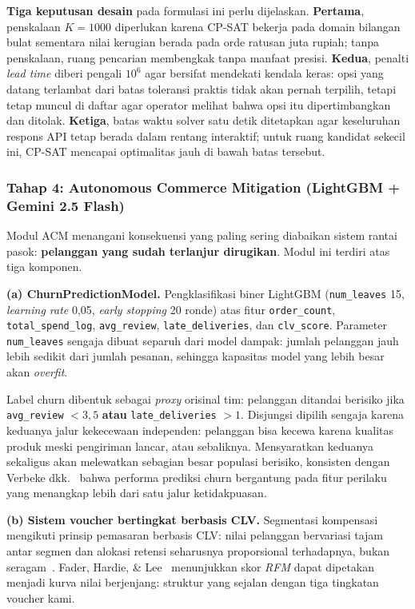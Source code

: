 \documentclass[12pt,a4paper]{article}
\begin{document}
\textbf{Tiga keputusan desain} pada formulasi ini perlu dijelaskan. \textbf{Pertama}, penskalaan $K=1000$ diperlukan karena CP-SAT bekerja pada domain bilangan bulat sementara nilai kerugian berada pada orde ratusan juta rupiah; tanpa penskalaan, ruang pencarian membengkak tanpa manfaat presisi. \textbf{Kedua}, penalti \textit{lead time} diberi pengali $10^6$ agar bersifat mendekati kendala keras: opsi yang datang terlambat dari batas toleransi praktis tidak akan pernah terpilih, tetapi tetap muncul di daftar agar operator melihat bahwa opsi itu dipertimbangkan dan ditolak. \textbf{Ketiga}, batas waktu solver satu detik ditetapkan agar keseluruhan respons API tetap berada dalam rentang interaktif; untuk ruang kandidat sekecil ini, CP-SAT mencapai optimalitas jauh di bawah batas tersebut.

\subsubsection{Tahap 4: Autonomous Commerce Mitigation (LightGBM + Gemini 2.5 Flash)}

Modul ACM menangani konsekuensi yang paling sering diabaikan sistem rantai pasok: \textbf{pelanggan yang sudah terlanjur dirugikan}. Modul ini terdiri atas tiga komponen.

\textbf{(a) ChurnPredictionModel.} Pengklasifikasi biner LightGBM (\texttt{num\_leaves} 15, \textit{learning rate} 0,05, \textit{early stopping} 20 ronde) atas fitur \texttt{order\_count}, \texttt{total\_spend\_log}, \texttt{avg\_review}, \texttt{late\_deliveries}, dan \texttt{clv\_score}. Parameter \texttt{num\_leaves} sengaja dibuat separuh dari model dampak: jumlah pelanggan jauh lebih sedikit dari jumlah pesanan, sehingga kapasitas model yang lebih besar akan \textit{overfit}.

Label churn dibentuk sebagai \textit{proxy} orisinal tim: pelanggan ditandai berisiko jika \texttt{avg\_review} $< 3{,}5$ \textbf{atau} \texttt{late\_deliveries} $> 1$. Disjungsi dipilih sengaja karena keduanya jalur kekecewaan independen: pelanggan bisa kecewa karena kualitas produk meski pengiriman lancar, atau sebaliknya. Mensyaratkan keduanya sekaligus akan melewatkan sebagian besar populasi berisiko, konsisten dengan Verbeke dkk.~\cite{verbeke} bahwa performa prediksi churn bergantung pada fitur perilaku yang menangkap lebih dari satu jalur ketidakpuasan.

\textbf{(b) Sistem voucher bertingkat berbasis CLV.} Segmentasi kompensasi mengikuti prinsip pemasaran berbasis CLV: nilai pelanggan bervariasi tajam antar segmen dan alokasi retensi seharusnya proporsional terhadapnya, bukan seragam~\cite{gupta,fader}. Fader, Hardie, \& Lee~\cite{fader} menunjukkan skor \textit{RFM} dapat dipetakan menjadi kurva nilai berjenjang: struktur yang sejalan dengan tiga tingkatan voucher kami.
\end{document}

